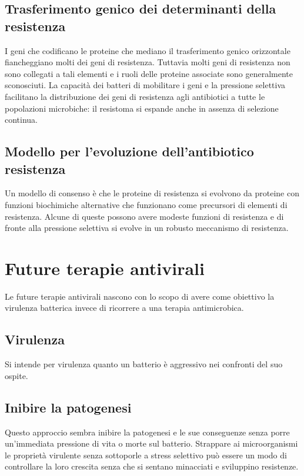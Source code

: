 	\subsection{Trasferimento genico dei determinanti della resistenza}
	I geni che codificano le proteine che mediano il trasferimento genico orizzontale fiancheggiano molti dei geni di resistenza.
	Tuttavia molti geni di resistenza non sono collegati a tali elementi e i ruoli delle proteine associate sono generalmente sconosciuti.
	La capacit\`a dei batteri di mobilitare i geni e la pressione selettiva facilitano la distribuzione dei geni di resistenza agli antibiotici a tutte le popolazioni microbiche: il resistoma si espande anche in assenza di selezione continua.

	\subsection{Modello per l'evoluzione dell'antibiotico resistenza}
	Un modello di consenso \`e che le proteine di resistenza si evolvono da proteine con funzioni biochimiche alternative che funzionano come precursori di elementi di resistenza.
	Alcune di queste possono avere modeste funzioni di resistenza e di fronte alla pressione selettiva si evolve in un robusto meccanismo di resistenza.

\section{Future terapie antivirali}
Le future terapie antivirali nascono con lo scopo di avere come obiettivo la virulenza batterica invece di ricorrere a una terapia antimicrobica.

	\subsection{Virulenza}
	Si intende per virulenza quanto un batterio \`e aggressivo nei confronti del suo ospite.
	
	\subsection{Inibire la patogenesi}
	Questo approccio sembra inibire la patogenesi e le sue conseguenze senza porre un'immediata pressione di vita o morte sul batterio.
	Strappare ai microorganismi le propriet\`a virulente senza sottoporle a stress selettivo pu\`o essere un modo di controllare la loro crescita senza che si sentano minacciati e sviluppino resistenze.

